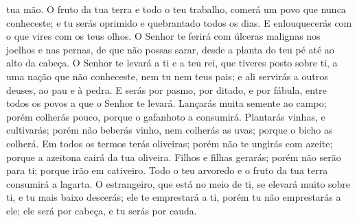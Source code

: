tua mão. O fruto da tua terra e todo o teu trabalho, comerá
um povo que nunca conheceste; e tu serás oprimido e quebrantado
todos os dias. E enlouquecerás com o que vires com os teus
olhos. O Senhor te ferirá com úlceras malignas nos joelhos e
nas pernas, de que não possas sarar, desde a planta do teu pé até ao
alto da cabeça. O Senhor te levará a ti e a teu rei, que
tiveres posto sobre ti, a uma nação que não conheceste, nem tu nem
teus pais; e ali servirás a outros deuses, ao pau e à pedra.
E serás por pasmo, por ditado, e por fábula, entre todos os
povos a que o Senhor te levará. Lançarás muita semente ao
campo; porém colherás pouco, porque o gafanhoto a consumirá.
Plantarás vinhas, e cultivarás; porém não beberás vinho, nem
colherás as uvas; porque o bicho as colherá. Em todos os
termos terás oliveiras; porém não te ungirás com azeite; porque a
azeitona cairá da tua oliveira. Filhos e filhas gerarás;
porém não serão para ti; porque irão em cativeiro. Todo o teu
arvoredo e o fruto da tua terra consumirá a lagarta. O
estrangeiro, que está no meio de ti, se elevará muito sobre ti, e tu
mais baixo descerás; ele te emprestará a ti, porém tu não
emprestarás a ele; ele será por cabeça, e tu serás por cauda.

